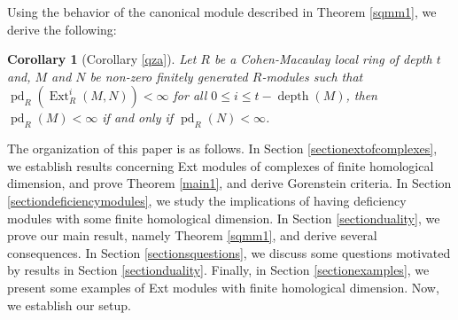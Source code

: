\documentclass[11pt, a4paper,pagebackref]{amsart}
\numberwithin{equation}{section}
\newtheorem{corollary}[theorem]{Corollary}
\theoremstyle{definition}
\newtheorem{remark and definition}[theorem]{Remark and Definition}
\newtheorem{remark and notation}[theorem]{Remark and Notation}
\newcommand\Ext{\operatorname{Ext}}
\begin{document}
Using the behavior of the canonical module described in Theorem \ref{sqmm1}, we derive the following:

\begin{corollary}[{Corollary \ref{qza}}]
    Let $R$ be  a Cohen-Macaulay local ring of depth $t$ and, $M$ and $N$ be non-zero finitely generated $R$-modules such that $\operatorname{pd}_R(\Ext_R^i(M,N))<\infty$ for all $0\leq i \leq t-\operatorname{depth}(M)$, then $\operatorname{pd}_R(M)<\infty$ if and only if $\operatorname{pd}_R(N)<\infty$.
\end{corollary}







The organization of this paper is as follows.  In Section \ref{sectionextofcomplexes}, we establish results concerning Ext modules of complexes of finite homological dimension, and prove Theorem \ref{main1}, and derive Gorenstein criteria. In Section \ref{sectiondeficiencymodules}, we study the implications of having deficiency modules with some finite homological dimension. In Section  \ref{sectionduality}, we prove our main result, namely Theorem \ref{sqmm1}, and derive several consequences. In Section \ref{sectionsquestions}, we discuss some questions motivated by results in Section \ref{sectionduality}. Finally, in Section \ref{sectionexamples}, we present some examples of Ext modules with finite homological dimension. Now, we establish our setup.
\end{document}
